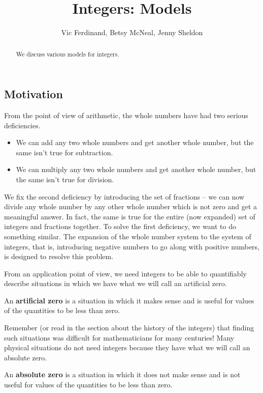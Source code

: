 \documentclass{ximera}
\title{Integers: Models}
\author{Vic Ferdinand, Betsy McNeal, Jenny Sheldon}
\begin{document}
\begin{abstract}
We discuss various models for integers.
\end{abstract}
\maketitle

\subsection{Motivation}

From the point of view of arithmetic, the whole numbers have had two serious deficiencies.
\begin{itemize}
	\item We can add any two whole numbers and get another whole number, but the same isn't true for subtraction.
	\item We can multiply any two whole numbers and get another whole number, but the same isn't true for division.
\end{itemize} 
We fix the second deficiency by introducing the set of fractions -- we can now divide any whole number by any other whole number which is not zero and get a meaningful answer.  In fact, the same is true for the entire (now expanded) set of integers and fractions together.  To solve the first deficiency, we want to do something similar.  The expansion of the whole number system to the system of integers, that is, introducing negative numbers to go along with positive numbers, is designed to resolve this problem.


From an application point of view, we need integers to be able to quantifiably describe situations in which we have what we will call an artificial zero.
\begin{definition}
An \textbf{artificial zero} is a situation in which it makes sense and is useful for values of the quantities to be less than zero.
\end{definition}
 Remember (or read in the section about the history of the integers) that finding such situations was difficult for mathematicians for many centuries!  Many physical situations do not need integers because they have what we will call an absolute zero.
 \begin{definition} An \textbf{absolute zero} is a situation in which it does not make sense and is not useful for values of the quantities to be less than zero.
 \end{definition}
 
\end{document}
